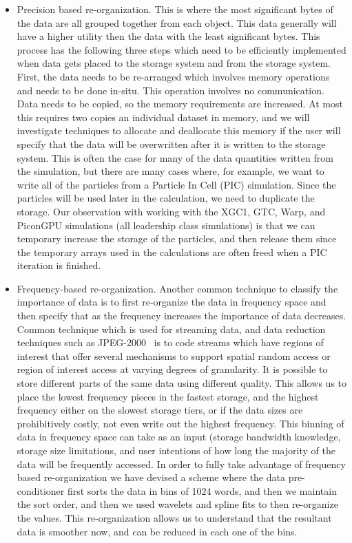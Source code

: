 \begin{itemize} 
	
\item Precision based re-organization. This is where the most significant bytes
	of the data are all grouped together from each object. This data
	generally will have a higher utility then the data with the least
	significant bytes.  This process has the following three steps which
	need to be efficiently implemented when data gets placed to the storage
	system and from the storage system.  First, the data needs to be
	re-arranged which involves memory operations and needs to be done
	in-situ. This operation involves no communication.  Data needs to be
	copied, so the memory requirements are increased. At most this requires
	two copies an individual dataset in memory, and we will investigate
	techniques to allocate and deallocate this memory if the user will
	specify that the data will be overwritten after it is written to the
	storage system. This is often the case for many of the data quantities
	written from the simulation, but there are many cases where, for
	example, we want to write all of the particles from a Particle In Cell
	(PIC) simulation.  Since the particles will be used later in the
	calculation, we need to duplicate the storage. Our observation with
	working with the XGC1, GTC, Warp, and PiconGPU simulations (all
	leadership class simulations) is that we can temporary increase the
	storage of the particles, and then release them since the temporary
	arrays used in the calculations are often freed when a PIC iteration is
	finished. 
%
\item Frequency-based re-organization.  Another common technique to classify
	the importance of data is to first re-organize the data in frequency
	space and then specify that as the frequency increases the importance
	of data decreases.   Common technique which is used for streaming data,
	and data reduction techniques such as JPEG-2000~\cite{jpeg2000} is to
	code streams which have regions of interest that offer several
	mechanisms to support spatial random access or region of interest
	access at varying degrees of granularity. It is possible to store
	different parts of the same data using different quality.  This allows
	us to place the lowest frequency pieces in the fastest storage, and the
	highest frequency either on the slowest storage tiers, or if the data
	sizes are prohibitively  costly, not even write out the highest
	frequency. This binning of data in frequency space can take as an input
	(storage bandwidth knowledge, storage size limitations, and user
	intentions of how long the majority of the data will be frequently
	accessed.  In order to fully take advantage of frequency based
	re-organization we have devised a scheme where the data pre-conditioner
	first sorts the data in bins of 1024 words, and then we maintain the
	sort order, and then we used wavelets and spline fits to then
	re-organize the values.  This re-organization allows us to understand
	that the resultant data is smoother now, and can be reduced in each one
	of the bins.  \end{itemize}

